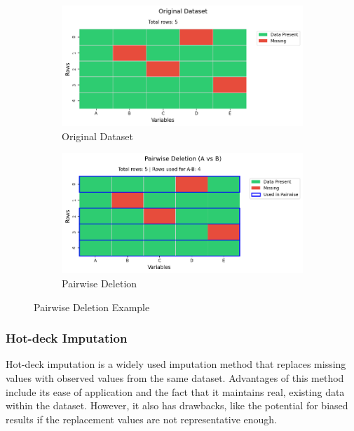 \documentclass[a4paper,12pt]{article}
\begin{document}
\begin{figure}[H]
\centering
\begin{subfigure}{0.48\textwidth}
\includegraphics[width=\linewidth]{original_dataset.png}
\caption{Original Dataset}
\end{subfigure}
\hfill
\begin{subfigure}{0.48\textwidth}
\includegraphics[width=\linewidth]{pairwise_deletion_(a_vs_b).png}
\caption{Pairwise Deletion}
\end{subfigure}
\caption{Pairwise Deletion Example}
\label{fig:pairwise_deletion}
\end{figure}

\subsubsection{Hot-deck Imputation}

Hot-deck imputation is a widely used imputation method that replaces missing values with observed values from the same dataset. Advantages of this method include its ease of application and the fact that it maintains real, existing data within the dataset. However, it also has drawbacks, like the potential for biased results if the replacement values are not representative enough. ~\cite{33}
\end{document}
